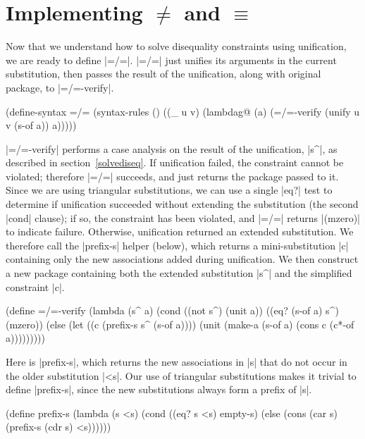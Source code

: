 \section{Implementing $\neq$ and $\equiv$}\label{neverequaloimplsection}

Now that we understand how to solve disequality constraints using
unification, we are ready to define \scheme|=/=|.
\scheme|=/=| just unifies its arguments in the current
substitution, then passes the result of the unification, along with
original package, to \scheme|=/=-verify|.

\schemedisplayspace
\begin{schemedisplay}
(define-syntax =/=
  (syntax-rules ()
    ((_ u v)
     (lambdag@ (a)
       (=/=-verify (unify u v (s-of a)) a)))))
\end{schemedisplay}

\scheme|=/=-verify| performs a case analysis on the result of the
unification, \scheme|s^|, as described in section~\ref{solvediseq}.
If unification failed, the constraint cannot be violated; therefore
\scheme|=/=| succeeds, and just returns the package passed to it.
Since we are using triangular substitutions, we can use a single
\scheme|eq?| test to determine if unification succeeded without
extending the substitution (the second \scheme|cond| clause); if so,
the constraint has been violated, and \scheme|=/=| returns \scheme|(mzero)|
to indicate failure.  Otherwise, unification returned an extended
substitution.  We therefore call the \scheme|prefix-s| helper (below),
which returns a mini-substitution \scheme|c| containing only the new
associations added during unification.  We then construct a new
package containing both the extended substitution \scheme|s^| and the
simplified constraint \scheme|c|.

\schemedisplayspace
\begin{schemedisplay}
(define =/=-verify
  (lambda (s^ a)
    (cond
      ((not s^) (unit a))
      ((eq? (s-of a) s^) (mzero))
      (else (let ((c (prefix-s s^ (s-of a))))
              (unit (make-a (s-of a) (cons c (c*-of a)))))))))
\end{schemedisplay}

Here is \scheme|prefix-s|, which returns the new associations in
\scheme|s| that do not occur in the older substitution \scheme|<s|.
Our use of triangular substitutions makes it trivial to define
\scheme|prefix-s|, since the new substitutions always form a prefix of
\scheme|s|.

\schemedisplayspace
\begin{schemedisplay}
(define prefix-s
  (lambda (s <s)
    (cond
      ((eq? s <s) empty-s)
      (else (cons (car s) (prefix-s (cdr s) <s))))))
\end{schemedisplay}

